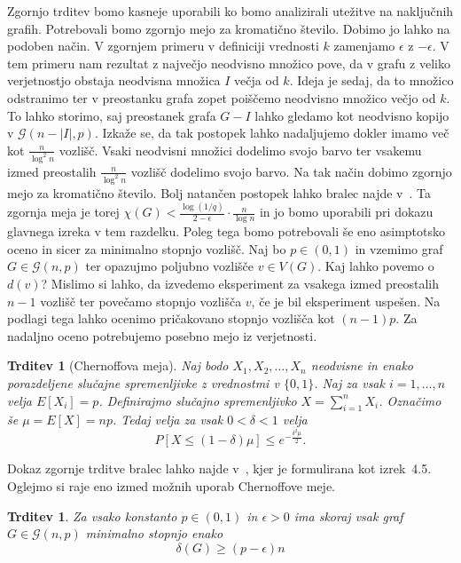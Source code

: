 \documentclass[12pt,a4paper,twoside]{article}
\theoremstyle{definition} %
\theoremstyle{plain} %
\newtheorem{trditev}[definicija]{Trditev}
\numberwithin{equation}{section}  %
\begin{document}
Zgornjo trditev bomo kasneje uporabili ko bomo analizirali utežitve na naključnih grafih. Potrebovali bomo zgornjo mejo za kromatično število. Dobimo jo lahko na podoben način. V zgornjem primeru v definiciji vrednosti $k$ zamenjamo $\epsilon$ z $-\epsilon$. V tem primeru nam rezultat z največjo neodvisno množico pove, da v grafu z veliko verjetnostjo obstaja neodvisna množica $I$ večja od $k$. Ideja je sedaj, da to množico odstranimo ter v preostanku grafa zopet poiščemo neodvisno množico večjo od $k$. To lahko storimo, saj preostanek grafa $G - I$ lahko gledamo kot neodvisno kopijo v $\mathcal{G}(n - |I|, p)$. Izkaže se, da tak postopek lahko nadaljujemo dokler imamo več kot $\frac{n}{\log^2n}$ vozlišč. Vsaki neodvisni množici dodelimo svojo barvo ter vsakemu izmed preostalih $\frac{n}{\log^2n}$ vozlišč dodelimo svojo barvo. Na tak način dobimo zgornjo mejo za kromatično število. Bolj natančen postopek lahko bralec najde v~\cite{random_col}. Ta zgornja meja je torej $\chi(G) < \frac{\log(1/q)}{2 - \epsilon} \cdot \frac{n}{\log n}$ in jo bomo uporabili pri dokazu glavnega izreka v tem razdelku. Poleg tega bomo potrebovali še eno asimptotsko oceno in sicer za minimalno stopnjo vozlišč. Naj bo $p \in (0, 1)$ in vzemimo graf $G \in  \mathcal{G}(n, p)$ ter opazujmo poljubno vozlišče $v \in V(G)$. Kaj lahko povemo o $d(v)$? Mislimo si lahko, da izvedemo eksperiment za vsakega izmed preostalih $n - 1$ vozlišč ter povečamo stopnjo vozlišča $v$, če je bil eksperiment uspešen. Na podlagi tega lahko ocenimo pričakovano stopnjo vozlišča kot $(n-1)p$. Za nadaljno oceno potrebujemo posebno mejo iz verjetnosti.
\begin{trditev}[Chernoffova meja]
Naj bodo $X_1, X_2, \ldots, X_n$ neodvisne in enako porazdeljene slučajne spremenljivke z vrednostmi v $\{0, 1\}$. Naj za vsak $i = 1, \ldots, n$ velja $E[X_i] = p$. Definirajmo slučajno spremenljivko $X = \sum_{i=1}^n X_i$. Označimo še $\mu = E[X] = np$. Tedaj velja za vsak $0 <\delta < 1$ velja
$$P[X \le (1-\delta) \mu] \le e ^{-\frac{\delta^2 \mu}{2}}. $$


\end{trditev}
Dokaz zgornje trditve bralec lahko najde v~\cite{chernov}, kjer je formulirana kot izrek~4.5. Oglejmo si raje eno izmed možnih uporab Chernoffove meje.
\begin{trditev}
Za vsako konstanto $p \in(0,1)$ in $\epsilon > 0$ ima skoraj vsak graf $G \in \mathcal{G}(n, p)$ minimalno stopnjo enako
$$\delta(G) \ge (p - \epsilon)n  $$
\end{trditev}
\end{document}
